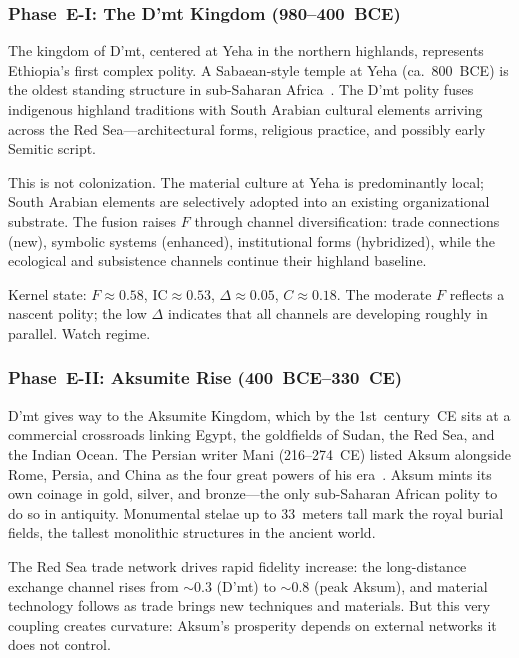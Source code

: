 \documentclass[
  aps,
  prd,
  twocolumn,
  superscriptaddress,
  nofootinbib,
  floatfix
]{revtex4-2}
\newcommand{\IC}{\mathrm{IC}}
\begin{document}
\subsubsection{Phase~E-I: The D'mt Kingdom
(980--400~BCE)}\label{sec:dmt}

The kingdom of D'mt, centered at Yeha in the
northern highlands, represents Ethiopia's first
complex polity.  A Sabaean-style temple at Yeha
(ca.\ 800~BCE) is the oldest standing structure in
sub-Saharan Africa~\cite{phillipson2012aksum}.  The
D'mt polity fuses indigenous highland traditions
with South Arabian cultural elements arriving across
the Red Sea---architectural forms, religious
practice, and possibly early Semitic script.

This is not colonization.  The material culture at
Yeha is predominantly local; South Arabian elements
are selectively adopted into an existing
organizational substrate.  The fusion raises $F$
through channel diversification: trade connections
(new), symbolic systems (enhanced), institutional
forms (hybridized), while the ecological and
subsistence channels continue their highland
baseline.

Kernel state: $F \approx 0.58$, $\IC \approx 0.53$,
$\Delta \approx 0.05$, $C \approx 0.18$.  The
moderate $F$ reflects a nascent polity; the low
$\Delta$ indicates that all channels are developing
roughly in parallel.  Watch regime.

\subsubsection{Phase~E-II: Aksumite Rise
(400~BCE--330~CE)}\label{sec:aksum-rise}

D'mt gives way to the Aksumite Kingdom, which by
the 1st~century~CE sits at a commercial crossroads
linking Egypt, the goldfields of Sudan, the Red Sea,
and the Indian Ocean.  The Persian writer Mani
(216--274~CE) listed Aksum alongside Rome, Persia,
and China as the four great powers of his
era~\cite{munrohay1991aksum}.  Aksum mints its own
coinage in gold, silver, and bronze---the only
sub-Saharan African polity to do so in antiquity.
Monumental stelae up to 33~meters tall mark the
royal burial fields, the tallest monolithic
structures in the ancient world.

The Red Sea trade network drives rapid fidelity
increase: the long-distance exchange channel rises
from $\sim$0.3 (D'mt) to $\sim$0.8 (peak Aksum),
and material technology follows as trade brings
new techniques and materials.  But this very
coupling creates curvature: Aksum's prosperity
depends on external networks it does not control.
\end{document}
